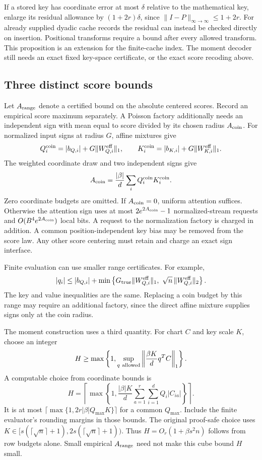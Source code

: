 If a stored key has coordinate error at most $\delta$ relative to
the mathematical key, enlarge its residual allowance by
$(1+2r)\delta$, since $\|I-P\|_{\infty\to\infty}\le1+2r$.
For already supplied dyadic cache records the residual can instead
be checked directly on insertion. Positional transforms require a bound after
every allowed transform. This proposition is an extension for the
finite-cache index. The moment decoder still needs an exact fixed
key-space certificate, or the exact score recoding above.

\subsection{Three distinct score bounds}

Let $A_{\rm range}$ denote a certified bound on the absolute
centered scores. Record an empirical score maximum separately.
A Poisson factory additionally needs an independent sign with
mean equal to score divided by its chosen radius $A_{\rm coin}$.
For normalized input signs at radius $G$, affine mixtures give
\[
 Q_i^{\rm coin}=|b_{Q,i}|+G\|W_{Q,i}^{\rm eff}\|_1,\qquad
 K_i^{\rm coin}=|b_{K,i}|+G\|W_{K,i}^{\rm eff}\|_1.
\]
The weighted coordinate draw and two independent signs give
\[
 A_{\rm coin}=\frac{|\beta|}{d}
       \sum_i Q_i^{\rm coin}K_i^{\rm coin}.
\]
Zero coordinate budgets are omitted. If $A_{\rm coin}=0$, uniform
attention suffices. Otherwise the attention sign uses at most $2e^{2A_{\rm coin}}-1$
normalized-stream requests and $O(B^4e^{2A_{\rm coin}})$ local
bits. A request to the normalization factory is charged in
addition. A common position-independent key bias may be removed
from the score law. Any other score centering must retain and
charge an exact sign interface.

Finite evaluation can use smaller range certificates. For example,
\[
 |q_i|\le |b_{Q,i}|+
 \min\left\{
 G_{\rm true}\|W_{Q,i}^{\rm eff}\|_1,\
 \sqrt n\,\|W_{Q,i}^{\rm eff}\|_2
 \right\}.
\]
The key and value inequalities are the same.
Replacing a coin budget by this range may require an additional
factory, since the direct affine mixture supplies signs only at the
coin radius.

The moment construction uses a third quantity. For chart $C$ and
key scale $K$, choose an integer
\[
 H\ge\max\left\{1,\sup_{q\ {\rm allowed}}
          \left\|\frac{\beta K}{d}q^TC\right\|_1\right\}.
\]
A computable choice from coordinate bounds is
\[
 H=\left\lceil\max\left\{1,\frac{|\beta|K}{d}
              \sum_{a=1}^r\sum_{i=1}^d Q_i|C_{ia}|\right\}\right\rceil.
\]
It is at most $\lceil\max\{1,2r|\beta|Q_{\max}K\}\rceil$ for a common
$Q_{\max}$. Include the finite evaluator's rounding margins in those
bounds. The original proof-safe choice uses
$K\in[s(\lceil\sqrt n\rceil+1),2s(\lceil\sqrt n\rceil+1))$.
Thus $H=O_r(1+\beta s^2n)$ follows from row budgets alone.
Small empirical $A_{\rm range}$ need not make this cube bound $H$
small.


